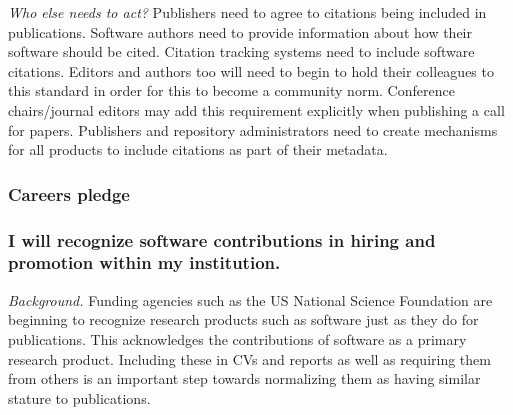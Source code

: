 \documentclass[a4paper,UKenglish]{dagman}
\renewcommand{\paragraph}[1]{\subsubsection*{#1}\xspace}
\newcommand{\etc}{\emph{etc.}\xspace}
\begin{document}
\emph{Who else needs to act?} Publishers need to agree to citations being included in publications. Software authors need to provide information about how their software should be cited. Citation tracking systems need to include software citations.
Editors and authors too will need to begin to hold their colleagues to this standard in order for this to become a community norm.
Conference chairs/journal editors may add this requirement explicitly when publishing a call for papers. Publishers and repository administrators
need to create mechanisms for all products to include citations as part of their metadata.





\subsubsection*{Careers pledge}

\paragraph{I will recognize software contributions in hiring and promotion within my institution.}

\emph{Background.}
Funding agencies such as the US National Science Foundation are beginning to recognize research products such as software just as they do for publications. This acknowledges the contributions of software as a primary research product. Including these in CVs and reports as well as requiring them from others is an important step towards normalizing them as having similar stature to publications.
\end{document}
